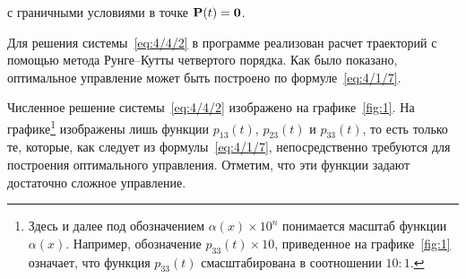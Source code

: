 \eeq

с граничными условиями в точке $\mathbf{P}(t) = \mathbf{0}$.

Для решения системы~\ref{eq:4/4/2} в программе реализован расчет траекторий с помощью метода Рунге--Кутты четвертого порядка. Как было показано, оптимальное управление может быть построено по формуле~\vref{eq:4/1/7}.


Численное решение системы~\ref{eq:4/4/2} изображено на графике~\ref{fig:1}. На графике\footnote{Здесь и далее под обозначением $\alpha(x) \times 10^n$ понимается масштаб функции $\alpha(x)$. Например, обозначение $p_{33}(t) \times 10$, приведенное на графике~\ref{fig:1} означает, что функция $p_{33}(t)$ смасштабирована в соотношении $10:1$.} изображены лишь функции $p_{13}(t)$, $p_{23}(t)$ и $p_{33}(t)$, то есть только те, которые, как следует из формулы~\ref{eq:4/1/7}, непосредственно требуются для построения оптимального управления. Отметим, что эти функции задают достаточно сложное управление.


